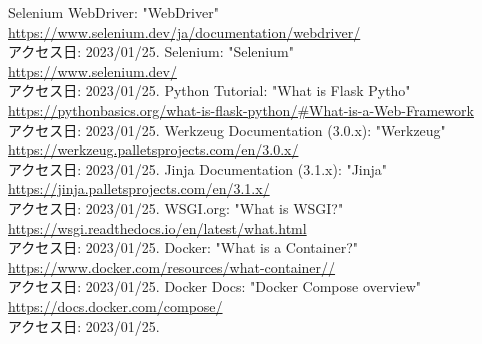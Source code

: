 \documentclass[uplatex, report, a4j, 10pt]{jsbook}
\begin{document}
\begin{thebibliography}{0}
    Selenium WebDriver: "WebDriver"\\\url{https://www.selenium.dev/ja/documentation/webdriver/}\\アクセス日: 2023/01/25.
    Selenium: "Selenium"\\\url{https://www.selenium.dev/}\\アクセス日: 2023/01/25. 
    Python Tutorial: "What is Flask Pytho"\\\url{https://pythonbasics.org/what-is-flask-python/#What-is-a-Web-Framework}\\アクセス日: 2023/01/25. 
    Werkzeug Documentation (3.0.x): "Werkzeug"\\\url{https://werkzeug.palletsprojects.com/en/3.0.x/}\\アクセス日: 2023/01/25. 
    Jinja Documentation (3.1.x): "Jinja"\\\url{https://jinja.palletsprojects.com/en/3.1.x/}\\アクセス日: 2023/01/25. 
    WSGI.org: "What is WSGI?"\\\url{https://wsgi.readthedocs.io/en/latest/what.html}\\アクセス日: 2023/01/25. 
    Docker: "What is a Container?"\\\url{https://www.docker.com/resources/what-container//}\\アクセス日: 2023/01/25. 
    Docker Docs: "Docker Compose overview"\\\url{https://docs.docker.com/compose/}\\アクセス日: 2023/01/25. 
    
\end{thebibliography}

\end{document}

